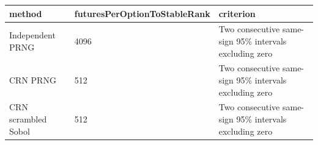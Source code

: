 \begin{tabular}{lll}
\toprule
method & futuresPerOptionToStableRank & criterion \\
\midrule
Independent PRNG & 4096 & Two consecutive same-sign 95\% intervals excluding zero \\
CRN PRNG & 512 & Two consecutive same-sign 95\% intervals excluding zero \\
CRN scrambled Sobol & 512 & Two consecutive same-sign 95\% intervals excluding zero \\
\bottomrule
\end{tabular}
